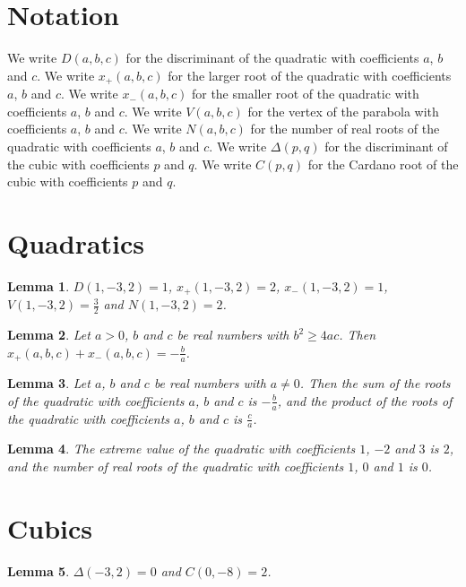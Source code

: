\documentclass{article}
\newtheorem{lemma}{Lemma}
\begin{document}
\section{Notation}

We write $D(a,b,c)$ for the discriminant of the quadratic with coefficients $a$, $b$ and $c$.
We write $x_+(a,b,c)$ for the larger root of the quadratic with coefficients $a$, $b$ and $c$.
We write $x_-(a,b,c)$ for the smaller root of the quadratic with coefficients $a$, $b$ and $c$.
We write $V(a,b,c)$ for the vertex of the parabola with coefficients $a$, $b$ and $c$.
We write $N(a,b,c)$ for the number of real roots of the quadratic with coefficients $a$, $b$ and $c$.
We write $\Delta(p,q)$ for the discriminant of the cubic with coefficients $p$ and $q$.
We write $C(p,q)$ for the Cardano root of the cubic with coefficients $p$ and $q$.

\section{Quadratics}

\begin{lemma}\label{example}
$D(1,-3,2)=1$, $x_+(1,-3,2)=2$, $x_-(1,-3,2)=1$, $V(1,-3,2)=\frac32$ and $N(1,-3,2)=2$.
\end{lemma}

\begin{lemma}\label{vieta}
Let $a>0$, $b$ and $c$ be real numbers with $b^2\ge4ac$. Then $x_+(a,b,c)+x_-(a,b,c)=-\frac{b}{a}$.
\end{lemma}

\begin{lemma}\label{vieta-complex}
Let $a$, $b$ and $c$ be real numbers with $a\neq0$. Then the sum of the roots of the quadratic with coefficients $a$, $b$ and $c$ is $-\frac{b}{a}$, and the product of the roots of the quadratic with coefficients $a$, $b$ and $c$ is $\frac{c}{a}$.
\end{lemma}

\begin{lemma}\label{extreme}
The extreme value of the quadratic with coefficients $1$, $-2$ and $3$ is $2$, and the number of real roots of the quadratic with coefficients $1$, $0$ and $1$ is $0$.
\end{lemma}

\section{Cubics}

\begin{lemma}\label{cubic}
$\Delta(-3,2)=0$ and $C(0,-8)=2$.
\end{lemma}
\end{document}
